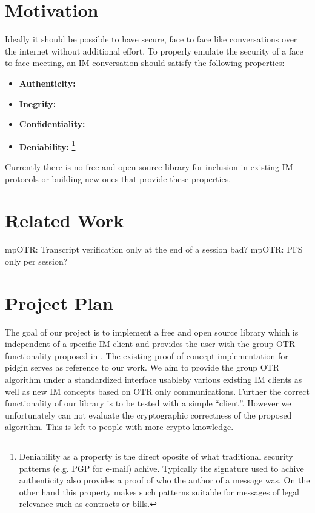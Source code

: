 \section{Motivation}
Ideally it should be possible to have secure, face to face like conversations over the internet without additional effort. To properly emulate the security of a face to face meeting, an IM conversation should satisfy the following properties:
\begin{itemize}
	\item{\textbf{Authenticity:}}
	\item{\textbf{Inegrity:}}
	\item{\textbf{Confidentiality:}}
	\item{\textbf{Deniability:} \footnote{Deniability as a property is the direct oposite of what traditional security patterns (e.g. PGP for e-mail) achive. Typically the signature used to achive authenticity also provides a proof of who the author of a message was. On the other hand this property makes such patterns suitable for messages of legal relevance such as contracts or bills.}}
\end{itemize}


Currently there is no free and open source library for inclusion in existing IM protocols or building new ones that provide these properties.

\section{Related Work}

mpOTR: Transcript verification only at the end of a session bad?
mpOTR: PFS only per session?

\section{Project Plan}
The goal of our project is to implement a free and open source library which is independent of a specific IM client and provides the user with the group OTR functionality proposed in \cite{impr-gotr}. The existing proof of concept implementation for pidgin serves as reference to our work. We aim to provide the group OTR algorithm under a standardized interface usableby various existing IM clients as well as new IM concepts based on OTR only communications. Further the correct functionality of our library is to be tested with a simple ``client''. However we unfortunately can not evaluate the cryptographic correctness of the proposed algorithm. This is left to people with more crypto knowledge.

